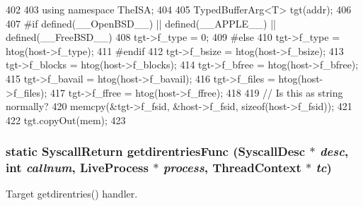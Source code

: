 \begin{DoxyCode}
402     {
403         using namespace TheISA;
404 
405         TypedBufferArg<T> tgt(addr);
406 
407 #if defined(__OpenBSD__) || defined(__APPLE__) || defined(__FreeBSD__)
408         tgt->f_type = 0;
409 #else
410         tgt->f_type = htog(host->f_type);
411 #endif
412         tgt->f_bsize = htog(host->f_bsize);
413         tgt->f_blocks = htog(host->f_blocks);
414         tgt->f_bfree = htog(host->f_bfree);
415         tgt->f_bavail = htog(host->f_bavail);
416         tgt->f_files = htog(host->f_files);
417         tgt->f_ffree = htog(host->f_ffree);
418 
419         // Is this as string normally?
420         memcpy(&tgt->f_fsid, &host->f_fsid, sizeof(host->f_fsid));
421 
422         tgt.copyOut(mem);
423     }
\end{DoxyCode}
\hypertarget{classTru64_a2e7bba81ca6d880e6cbf4e1db6100a68}{
\subsubsection[{getdirentriesFunc}]{\setlength{\rightskip}{0pt plus 5cm}static {\bf SyscallReturn} getdirentriesFunc ({\bf SyscallDesc} $\ast$ {\em desc}, \/  int {\em callnum}, \/  {\bf LiveProcess} $\ast$ {\em process}, \/  {\bf ThreadContext} $\ast$ {\em tc})}}
\label{classTru64_a2e7bba81ca6d880e6cbf4e1db6100a68}


Target getdirentries() handler. 


